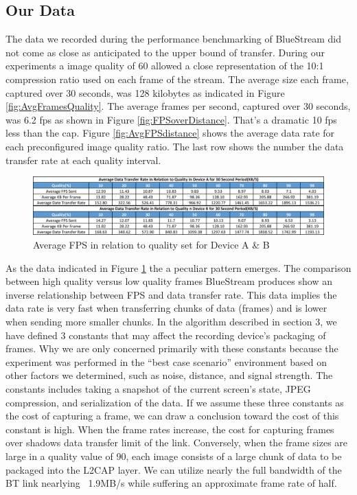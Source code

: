 \documentclass[a4paper,12pt]{article}
\begin{document}
\subsection{Our Data}

The data we recorded during the performance benchmarking of BlueStream did not come as close as anticipated to the upper bound of transfer. During our experiments a image quality of 60 allowed a close representation of the 10:1 compression ratio used on each frame of the stream. The average size each frame, captured over 30 seconds, was 128 kilobytes as indicated in Figure \ref{fig:AvgFramesQuality}. The average frames per second, captured over 30 seconds, was 6.2 fps as shown in Figure \ref{fig:FPSoverDistance}. That’s a dramatic 10 fps less than the cap. Figure \ref{fig:AvgFPSdistance} shows the average data rate for each preconfigured image quality ratio. The last row shows the number the data transfer rate at each quality interval.

\begin{figure}[h!]
\centering
\includegraphics[scale=.7]{Figures/Figure13.png}
\caption{Average FPS in relation to quality set for Device A \& B}
\label{fig:ScalingDimension}
\end{figure}

As the data indicated in Figure \ref{fig:ScalingDimension} the a peculiar pattern emerges. The comparison between high quality versus low quality frames BlueStream produces show an inverse relationship between FPS and data transfer rate. This data implies the data rate is very fast when transferring chunks of data (frames) and is lower when sending more smaller chunks. In the algorithm described in section 3, we have defined 3 constants that may affect the recording device’s packaging of frames. Why we are only concerned primarily with these constants because the experiment was performed in the “best case scenario” environment based on other factors we determined, such as noise, distance, and signal strength. The constants includes taking a snapshot of the current screen’s state, JPEG compression, and serialization of the data. If we assume these three constants as the cost of capturing a frame, we can draw a conclusion toward the cost of this constant is high. When the frame rates increase, the cost for capturing frames over shadows data transfer limit of the link. Conversely, when the frame sizes are large in a quality value of 90, each image consists of a large chunk of data to be packaged into the L2CAP layer. We can utilize nearly the full bandwidth of the BT link nearlying ~1.9MB/s while suffering an approximate frame rate of half. 
\end{document}

